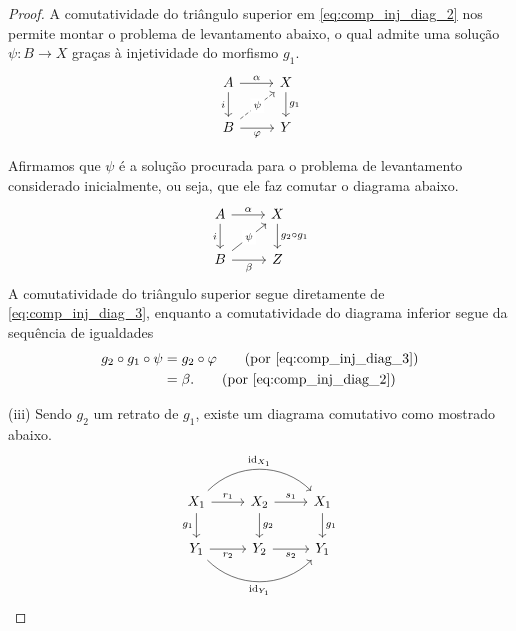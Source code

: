 \begin{proof}
  A comutatividade do triângulo superior em \eqref{eq:comp_inj_diag_2} nos permite montar o problema de levantamento abaixo, o qual admite uma solução $\psi: B \to X$ graças à injetividade do morfismo $g_1$.
  \begin{equation}\label{eq:comp_inj_diag_3}
    \begin{tikzcd}
      A
      \arrow[r, "\alpha"]
      \arrow[d, "i" swap]
      & X
      \arrow[d, "g_1"]
      \\ B
      \arrow[r, "\varphi" swap]
      \arrow[ru, dashed, "\psi" description]
      & Y
    \end{tikzcd}
  \end{equation}

  Afirmamos que $\psi$ é a solução procurada para o problema de levantamento considerado inicialmente, ou seja, que ele faz comutar o diagrama abaixo.
  \begin{displaymath}
    \begin{tikzcd}
      A
      \arrow[r, "\alpha"]
      \arrow[d, "i" swap]
      & X
      \arrow[d, "g_2 \circ g_1"]
      \\ B
      \arrow[r, "\beta" swap]
      \arrow[ru, "\psi" description]
      & Z
    \end{tikzcd}
  \end{displaymath}
  A comutatividade do triângulo superior segue diretamente de \eqref{eq:comp_inj_diag_3}, enquanto a comutatividade do diagrama inferior segue da sequência de igualdades
  \begin{align*}
    g_2 \circ g_1 \circ \psi
    & = g_2 \circ \varphi \tag{por \eqref{eq:comp_inj_diag_3}} \\
    & = \beta. \tag{por \eqref{eq:comp_inj_diag_2}}
  \end{align*}

  \smallskip
  (iii) Sendo $g_2$ um retrato de $g_1$, existe um diagrama comutativo como mostrado abaixo.
  \begin{equation}\label{eq:retracao_inj_diag_1}
    \begin{tikzcd}
      X_1
      \arrow[d, "g_1" swap]
      \arrow[r, "r_1"]
      \arrow[rr, bend left=45, "\id_{X_1}"]
      & X_2
      \arrow[r, "s_1"]
      \arrow[d, "g_2"]
      & X_1
      \arrow[d, "g_1"]
      \\ Y_1
      \arrow[r, "r_2" swap]
      \arrow[rr, bend right=45, "\id_{Y_1}" swap]
      & Y_2
      \arrow[r, "s_2" swap]
      & Y_1
    \end{tikzcd}
  \end{equation}


\end{proof}
